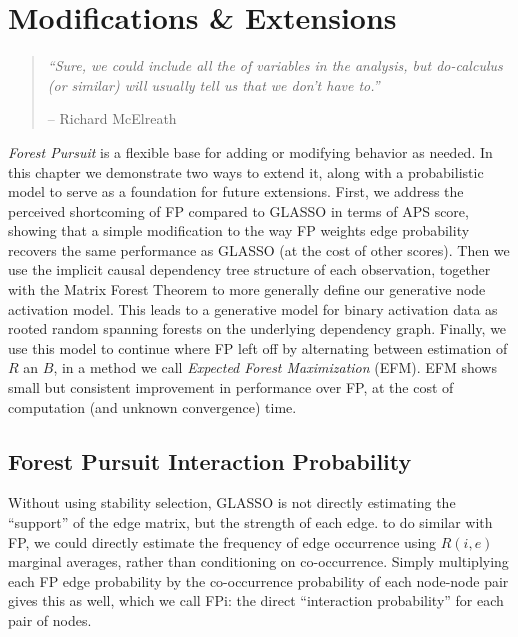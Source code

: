 \documentclass[%
	12pt,
		oneside,
		letterpaper
]{book}
\begin{document}
\chapter{Modifications \& Extensions}\label{sec-extend}

\begin{flushright}

\begin{minipage}{.7\linewidth}

\singlespacing

\begin{quote}
\emph{``Sure, we could include all the of variables in the analysis, but do-calculus (or similar) will usually tell us that we don't have to.''}

\hfill -- Richard McElreath\\
\doublespacing
\end{quote}

\end{minipage}

\end{flushright}

\emph{Forest Pursuit} is a flexible base for adding or modifying behavior as needed.
In this chapter we demonstrate two ways to extend it, along with a probabilistic model to serve as a foundation for future extensions.
First, we address the perceived shortcoming of FP compared to GLASSO in terms of APS score, showing that a simple modification to the way FP weights edge probability recovers the same performance as GLASSO (at the cost of other scores).
Then we use the implicit causal dependency tree structure of each observation, together with the Matrix Forest Theorem \autocite{MatrixForestTheorem_Chebotarev2006,Countingrootedforests_Knill2013} to more generally define our generative node activation model.
This leads to a generative model for binary activation data as rooted random spanning forests on the underlying dependency graph.
Finally, we use this model to continue where FP left off by alternating between estimation of \(R\) an \(B\), in a method we call \emph{Expected Forest Maximization} (EFM).
EFM shows small but consistent improvement in performance over FP, at the cost of computation (and unknown convergence) time.

\section{Forest Pursuit Interaction Probability}\label{sec-fpi}

Without using stability selection\autocite{StabilitySelection_Meinshausen2010}, GLASSO is not directly estimating the ``support'' of the edge matrix, but the strength of each edge.
to do similar with FP, we could directly estimate the frequency of edge occurrence using \(R(i,e)\) marginal averages, rather than conditioning on co-occurrence.
Simply multiplying each FP edge probability by the co-occurrence probability of each node-node pair gives this as well, which we call FPi: the direct ``interaction probability'' for each pair of nodes.
\end{document}
